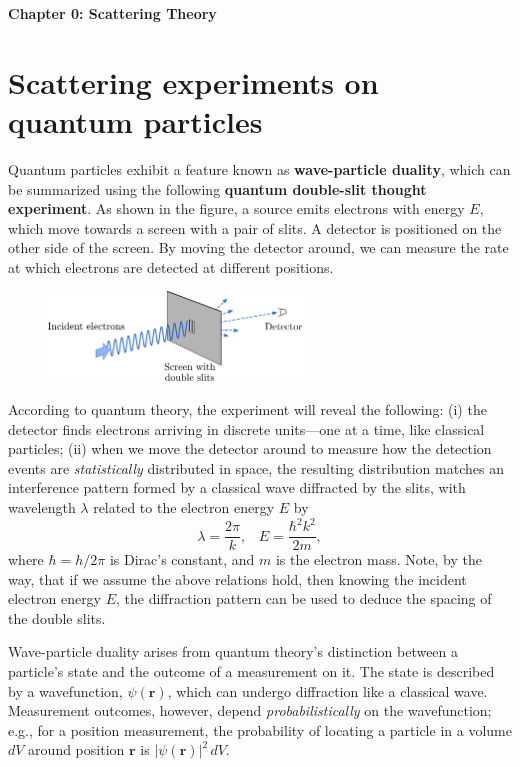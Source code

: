\documentclass[pra,12pt]{revtex4}
\begin{document}
\begin{center}
{\Large \textbf{Chapter 0: Scattering Theory}}
\end{center}


\section{Scattering experiments on quantum particles}

Quantum particles exhibit a feature known as \textbf{wave-particle
  duality}, which can be summarized using the following
\textbf{quantum double-slit thought experiment}.  As shown in the
figure, a source emits electrons with energy $E$, which move towards a
screen with a pair of slits.  A detector is positioned on the other
side of the screen.  By moving the detector around, we can measure the
rate at which electrons are detected at different positions.

\begin{figure}[h]
  \centering\includegraphics[width=0.6\textwidth]{doubleslit}
\end{figure}

According to quantum theory, the experiment will reveal the following:
(i) the detector finds electrons arriving in discrete units---one at a
time, like classical particles; (ii) when we move the detector around
to measure how the detection events are \textit{statistically}
distributed in space, the resulting distribution matches an
interference pattern formed by a classical wave diffracted by the
slits, with wavelength $\lambda$ related to the electron energy $E$ by
$$\lambda = \frac{2\pi}{k}, \;\;\; E = \frac{\hbar^2k^2}{2m},$$
where $\hbar = h/2\pi$ is Dirac's constant, and $m$ is the electron
mass.  Note, by the way, that if we assume the above relations hold,
then knowing the incident electron energy $E$, the diffraction pattern
can be used to deduce the spacing of the double slits.

Wave-particle duality arises from quantum theory's distinction between
a particle's state and the outcome of a measurement on it.  The state
is described by a wavefunction, $\psi(\mathbf{r})$, which can undergo
diffraction like a classical wave.  Measurement outcomes, however,
depend \textit{probabilistically} on the wavefunction; e.g., for a
position measurement, the probability of locating a particle in a
volume $dV$ around position $\mathbf{r}$ is $|\psi(\mathbf{r})|^2
\,dV$.
\end{document}
